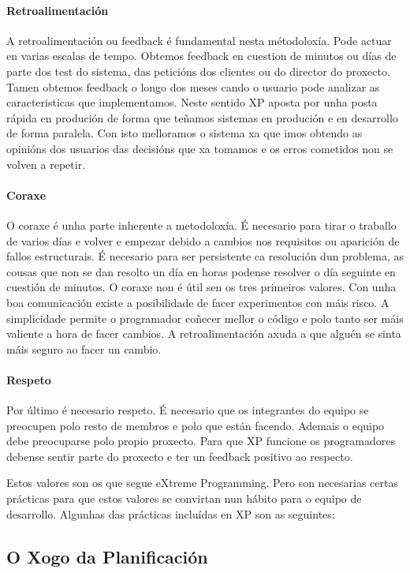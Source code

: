 \paragraph{Retroalimentación} A retroalimentación ou feedback é fundamental nesta métodoloxía. Pode actuar en varias escalas de tempo. Obtemos feedback en cuestion de minutos ou días de parte dos test do sistema, das peticións dos clientes ou do director do proxecto. Tamen obtemos feedback o longo dos meses cando o usuario pode analizar as caracteristicas que implementamos. Neste sentido XP aposta por unha posta rápida en produción de forma que teñamos sistemas en produción e en desarrollo de forma paralela. Con isto melloramos o sistema xa que imos obtendo as opinións dos usuarios das decisións que xa tomamos e os erros cometidos non se volven a repetir.

\paragraph{Coraxe} O coraxe é unha parte inherente a metodoloxía. É necesario para tirar o traballo de varios días e volver e empezar debido a cambios nos requisitos ou aparición de fallos estructurais. É necesario para ser persistente ca resolución dun problema, as cousas que non se dan resolto un día en horas podense resolver o día seguinte en cuestión de minutos. O coraxe non é útil sen os tres primeiros valores. Con unha boa comunicación existe a posibilidade de facer experimentos con máis risco. A simplicidade permite o programador coñecer mellor o código e polo tanto ser máis valiente a hora de facer cambios. A retroalimentación axuda a que alguén se sinta máis seguro ao facer un cambio.

\paragraph{Respeto} Por último é necesario respeto. É necesario que os integrantes do equipo se preocupen polo resto de membros e polo que están facendo. Ademais o equipo debe preocuparse polo propio proxecto. Para que XP funcione os programadores debense sentir parte do proxecto e ter un feedback positivo ao respecto.

Estos valores son os que segue eXtreme Programming. Pero son necesarias certas prácticas para que estos valores se convirtan nun hábito para o equipo de desarrollo. Algunhas das prácticas incluídas en XP son as seguintes:

\subsection{O Xogo da Planificación}

